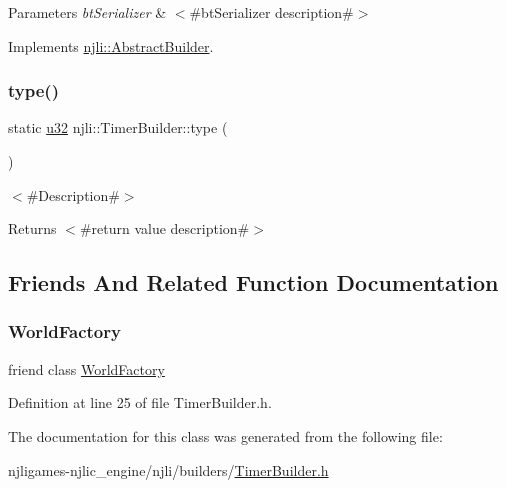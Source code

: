 \begin{DoxyParams}{Parameters}
{\em bt\+Serializer} & $<$\#bt\+Serializer description\#$>$ \\
\hline
\end{DoxyParams}


Implements \mbox{\hyperlink{classnjli_1_1_abstract_builder_ab66b774e02ccb9da554c9aab7fa6d981}{njli\+::\+Abstract\+Builder}}.

\mbox{\label{classnjli_1_1_timer_builder_a13a97322d239136b0302a73a92d4ef01}} 
\subsubsection{\texorpdfstring{type()}{type()}}
{\footnotesize\ttfamily static \mbox{\hyperlink{_util_8h_a10e94b422ef0c20dcdec20d31a1f5049}{u32}} njli\+::\+Timer\+Builder\+::type (\begin{DoxyParamCaption}{ }\end{DoxyParamCaption})\hspace{0.3cm}{\ttfamily [static]}}

$<$\#\+Description\#$>$

\begin{DoxyReturn}{Returns}
$<$\#return value description\#$>$ 
\end{DoxyReturn}


\subsection{Friends And Related Function Documentation}
\mbox{\label{classnjli_1_1_timer_builder_acb96ebb09abe8f2a37a915a842babfac}} 
\subsubsection{\texorpdfstring{World\+Factory}{WorldFactory}}
{\footnotesize\ttfamily friend class \mbox{\hyperlink{classnjli_1_1_world_factory}{World\+Factory}}\hspace{0.3cm}{\ttfamily [friend]}}



Definition at line 25 of file Timer\+Builder.\+h.



The documentation for this class was generated from the following file\+:\begin{DoxyCompactItemize}
\item 
njligames-\/njlic\+\_\+engine/njli/builders/\mbox{\hyperlink{_timer_builder_8h}{Timer\+Builder.\+h}}\end{DoxyCompactItemize}
